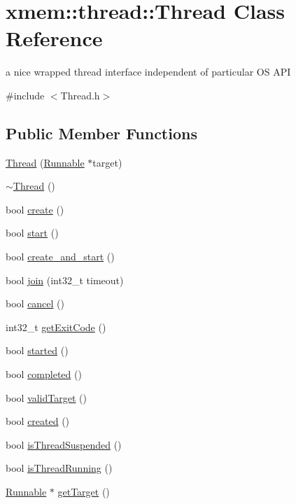 \hypertarget{classxmem_1_1thread_1_1_thread}{}\section{xmem\+:\+:thread\+:\+:Thread Class Reference}
\label{classxmem_1_1thread_1_1_thread}


a nice wrapped thread interface independent of particular O\+S A\+P\+I  




{\ttfamily \#include $<$Thread.\+h$>$}

\subsection*{Public Member Functions}
\begin{DoxyCompactItemize}
\item 
\hyperlink{classxmem_1_1thread_1_1_thread_a3248f8f92c293da9c20b78f443e61d76}{Thread} (\hyperlink{classxmem_1_1thread_1_1_runnable}{Runnable} $\ast$target)
\item 
\hyperlink{classxmem_1_1thread_1_1_thread_a37d9edd3a1a776cbc27dedff949c9726}{$\sim$\+Thread} ()
\item 
bool \hyperlink{classxmem_1_1thread_1_1_thread_a205afc741b86116bba9356b620a71cdf}{create} ()
\item 
bool \hyperlink{classxmem_1_1thread_1_1_thread_ac6142aac30e463bd99d703743f559d40}{start} ()
\item 
bool \hyperlink{classxmem_1_1thread_1_1_thread_a7550e894f4a83043fe4a4e93aee2def6}{create\+\_\+and\+\_\+start} ()
\item 
bool \hyperlink{classxmem_1_1thread_1_1_thread_ab1515cbc6982541f5327ff71a8d97a45}{join} (int32\+\_\+t timeout)
\item 
bool \hyperlink{classxmem_1_1thread_1_1_thread_a5d52b4357af2956e10fd72d80d540cf1}{cancel} ()
\item 
int32\+\_\+t \hyperlink{classxmem_1_1thread_1_1_thread_a6557774d3e8cf0bd92e8ba372cd23b85}{get\+Exit\+Code} ()
\item 
bool \hyperlink{classxmem_1_1thread_1_1_thread_a453a8b976b95c33d94b07fbca2ac414a}{started} ()
\item 
bool \hyperlink{classxmem_1_1thread_1_1_thread_a6d6ccbf6832d66803c6a527bad3943d8}{completed} ()
\item 
bool \hyperlink{classxmem_1_1thread_1_1_thread_ab91a2a9e8beb035106ba2d46ab32153c}{valid\+Target} ()
\item 
bool \hyperlink{classxmem_1_1thread_1_1_thread_a6a5f80bf0bca5ea5b18246aa2b1af250}{created} ()
\item 
bool \hyperlink{classxmem_1_1thread_1_1_thread_ab5c96a075727d5ffbec86213517a1795}{is\+Thread\+Suspended} ()
\item 
bool \hyperlink{classxmem_1_1thread_1_1_thread_afd810140b83b3a2ad90a425ea92dc366}{is\+Thread\+Running} ()
\item 
\hyperlink{classxmem_1_1thread_1_1_runnable}{Runnable} $\ast$ \hyperlink{classxmem_1_1thread_1_1_thread_a0cb4d94dd3f3d885794ce596a5198595}{get\+Target} ()
\end{DoxyCompactItemize}


